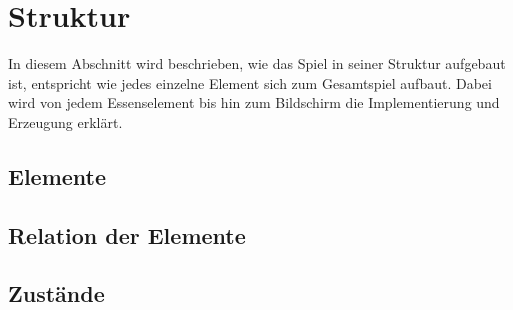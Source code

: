 
\chapter{Struktur}
\label{Struktur}
%
In diesem Abschnitt wird beschrieben, wie das Spiel in seiner Struktur aufgebaut ist, entspricht wie jedes einzelne Element sich zum Gesamtspiel aufbaut. Dabei wird von jedem Essenselement bis hin zum Bildschirm die Implementierung und Erzeugung erkl{\"a}rt.
%
\section{Elemente}
\label{Elemente}
%




%
\section{Relation der Elemente}
\label{Relation_der_Elemente}
%

%
\section{Zust{\"a}nde}
\label{Zustaende}
%

%
